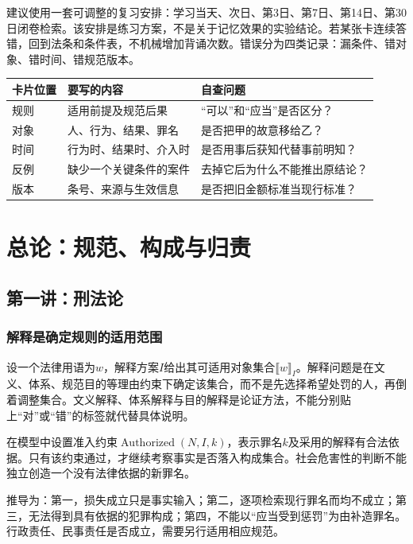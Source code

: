 建议使用一套可调整的复习安排：学习当天、次日、第3日、第7日、第14日、第30日闭卷检索。该安排是练习方案，不是关于记忆效果的实验结论。若某张卡连续答错，回到法条和条件表，不机械增加背诵次数。错误分为四类记录：漏条件、错对象、错时间、错规范版本。

\begin{center}
\begin{tabular}{p{}p{}p{}}
\toprule
卡片位置 & 要写的内容 & 自查问题\\\midrule
规则 & 适用前提及规范后果 & “可以”和“应当”是否区分？\\
对象 & 人、行为、结果、罪名 & 是否把甲的故意移给乙？\\
时间 & 行为时、结果时、介入时 & 是否用事后获知代替事前明知？\\
反例 & 缺少一个关键条件的案件 & 去掉它后为什么不能推出原结论？\\
版本 & 条号、来源与生效信息 & 是否把旧金额标准当现行标准？\\\bottomrule
\end{tabular}
\end{center}

\chapter{总论：规范、构成与归责}

\section{第一讲：刑法论}
\subsection{解释是确定规则的适用范围}
设一个法律用语为$w$，解释方案$I$给出其可适用对象集合$\llbracket w\rrbracket_I$。解释问题是在文义、体系、规范目的等理由约束下确定该集合，而不是先选择希望处罚的人，再倒着调整集合。文义解释、体系解释与目的解释是论证方法，不能分别贴上“对”或“错”的标签就代替具体说明。


在模型中设置准入约束$\operatorname{Authorized}(N,I,k)$，表示罪名$k$及采用的解释有合法依据。只有该约束通过，才继续考察事实是否落入构成集合。社会危害性的判断不能独立创造一个没有法律依据的新罪名。

推导为：第一，损失成立只是事实输入；第二，逐项检索现行罪名而均不成立；第三，无法得到具有依据的犯罪构成；第四，不能以“应当受到惩罚”为由补造罪名。行政责任、民事责任是否成立，需要另行适用相应规范。

